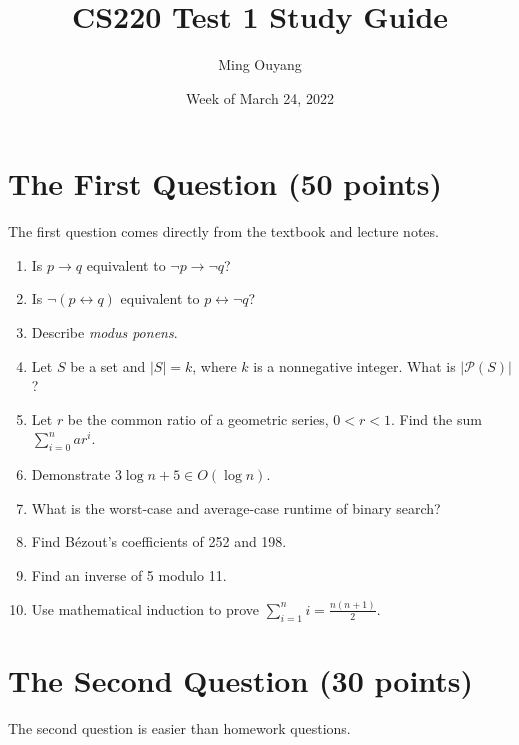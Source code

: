 \documentclass[11pt]{article}
\title{CS220 Test 1 Study Guide}
\author{Ming Ouyang}
\date{Week of March 24, 2022}
\begin{document}
\maketitle

\section{The First Question (50 points)}
The first question comes directly from the textbook and lecture notes.

\begin{enumerate}
    \item Is $p \to q$ equivalent to $\neg p \to \neg q$?
    \item Is $\neg (p \leftrightarrow q)$ equivalent to $p \leftrightarrow \neg q$?
    \item Describe \textit{modus ponens}.
    \item Let $S$ be a set and $|S| = k$, where $k$ is a nonnegative integer. What is $|\mathcal{P}(S)|$?
    \item Let $r$ be the common ratio of a geometric series, $0 < r < 1$. Find the sum $\sum_{i=0}^{n} ar^i$.
    \item Demonstrate $3 \log n + 5 \in O(\log n)$.
    \item What is the worst-case and average-case runtime of binary search?
    \item Find B\'{e}zout's coefficients of 252 and 198.
    \item Find an inverse of 5 modulo 11.
    \item Use mathematical induction to prove $\sum_{i=1}^{n} i = \frac{n(n + 1)}{2}$.
\end{enumerate}

\section{The Second Question (30 points)}
The second question is easier than homework questions.
\end{document}
